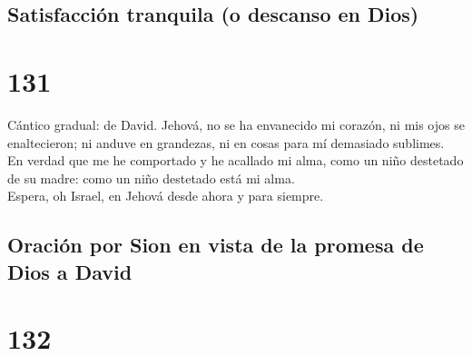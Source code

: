 \hypertarget{satisfacciuxf3n-tranquila-o-descanso-en-dios}{%
\subsection{Satisfacción tranquila (o descanso en
Dios)}\label{satisfacciuxf3n-tranquila-o-descanso-en-dios}}

\hypertarget{section-130}{%
\section{131}\label{section-130}}

 Cántico gradual: de David. Jehová, no se ha envanecido mi
corazón, ni mis ojos se enaltecieron; ni anduve en grandezas, ni en
cosas para mí demasiado sublimes.\\
 En verdad que me he comportado y he acallado mi alma,
como un niño destetado de su madre: como un niño destetado está mi
alma.\\
 Espera, oh Israel, en Jehová desde ahora y para siempre.

\hypertarget{oraciuxf3n-por-sion-en-vista-de-la-promesa-de-dios-a-david}{%
\subsection{Oración por Sion en vista de la promesa de Dios a
David}\label{oraciuxf3n-por-sion-en-vista-de-la-promesa-de-dios-a-david}}

\hypertarget{section-131}{%
\section{132}\label{section-131}}

